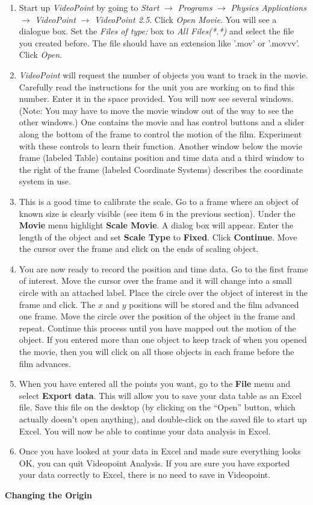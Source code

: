 \begin{enumerate}
\item Start up \textit{VideoPoint} by going to \textit{Start} $\rightarrow$ 
\textit{Programs} $\rightarrow$ \textit{Physics Applications} $\rightarrow$
\textit{VideoPoint} $\rightarrow$ \textit{VideoPoint 2.5}. Click \textit{Open 
Movie}. You will see a dialogue box. Set the \textit{Files of type:} box to 
\textit{All Files(*.*)} and select the file you created before. The file 
should have an extension like '.mov' or '.movvv'. Click \textit{Open}.
\item \textit{VideoPoint} will request the number of objects you want to
track in the movie. Carefully read the instructions for the unit you
are working on to find this number. Enter it in the space provided.
You will now see several windows. 
(Note: You may have to move the movie window out of the way to see the
other windows.) One contains the movie and has control
buttons and a slider along the bottom of the frame to control the
motion of the film. Experiment with these controls to learn their
function. Another window below the movie frame (labeled Table) contains position 
and time data and a third window to the right of the frame (labeled Coordinate
Systems) describes the coordinate system in use.
\item This is a good time to calibrate the scale. Go to a frame where an
object of known size is clearly visible (see item 6
in the previous
section). Under the \textbf{Movie} menu highlight \textbf{Scale Movie}.
A dialog box will appear. Enter the length of the object and set \textbf{Scale
Type} to \textbf{Fixed}. Click \textbf{Continue}. Move the cursor
over the frame and click on the ends of scaling object.
\item You are now ready to record the position and time data. Go to the
first frame of interest. Move the cursor over the frame and it will
change into a small circle with an attached label. Place the circle
over the object of interest in the frame and click. The $x$ and $y$ positions
will be stored and the film advanced one frame. Move the circle over
the position of the object in the frame and repeat. Continue this
process until you have mapped out the motion of the object. If you
entered more than one object to keep track of when you opened the
movie, then you will click on all those objects in each frame before
the film advances.
\item When you have entered all the points you want, go to the
\textbf{File} menu and select \textbf{Export data}.  This will
allow you to save your data table as an Excel file. 
Save this
file on the desktop (by clicking on the ``Open'' button, which actually
doesn't open anything), and double-click on the saved file to start up Excel.
You will now be able to continue your data analysis in Excel.

\item Once you have looked at your data in Excel and made sure everything
looks OK, you can quit Videopoint Analysis.  If you are sure you have
exported your data correctly to Excel, there is no need to save in Videopoint.

\end{enumerate}
\textbf{Changing the Origin} 


